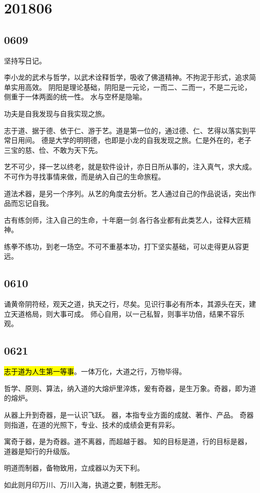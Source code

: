 \section{201806}

\subsection{0609}

坚持写日记。

李小龙的武术与哲学，以武术诠释哲学，吸收了佛道精神。不拘泥于形式，追求简单实用高效。
阴阳是理论基础，阴阳是一元论，一而二、二而一，不是二元论，侧重于一体两面的统一性。
水与空杯是隐喻。

功夫是自我发现与自我实现之旅。

志于道、据于德、依于仁、游于艺。道是第一位的，通过德、仁、艺得以落实到平常日用间。
德是大学的明明德，也即是小龙的自我发现之旅。仁是外在的，老子三宝的慈、俭、不敢为天下先。

艺不可少，择一艺以终老，就是软件设计，亦日日所从事的，注入真气，求大成。
不可作为寻找事情来做，而是纳入自己的生命旅程。

道法术器，是另一个序列。从艺的角度去分析。艺人通过自己的作品说话，突出作品而忘记自我。

古有练剑师，注入自己的生命，十年磨一剑.各行各业都有此类艺人，诠释大匠精神。

练拳不练功，到老一场空。不可不重基本功，打下坚实基础，可以走得更从容更远。

\subsection{0610}

诵黄帝阴符经，观天之道，执天之行，尽矣。见识行事必有所本，其源头在天，建立天道格局，则大事可成。
师心自用，以一己私智，则事半功倍，结果不容乐观。

\subsection{0621}

\hl{志于道为人生第一等事}。一体万化，大道之行，万物毕得。

哲学、原则、算法，纳入道的大熔炉里淬炼，爰有奇器，是生万象。奇器，即为道的熔炉。

从器上升到奇器，是一认识飞跃。
器，本指专业方面的成就、著作、产品。
奇器则指道，在道的光照下，专业、技术的成绩会更有异彩。

寓奇于器，是为奇器。道不离器，而超越于器。
知的目标是道，行的目标是器，道器是知行的升级版。

明道而制器，备物致用，立成器以为天下利。

如此则月印万川、万川入海，执道之要，制胜无形。
